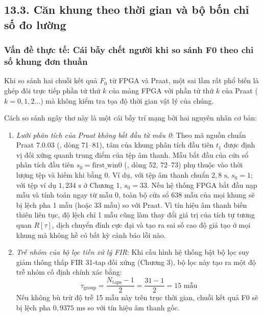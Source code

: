 \subsection*{13.3. Căn khung theo thời gian và bộ bốn chỉ số đo lường}

\subsubsection*{Vấn đề thực tế: Cái bẫy chết người khi so sánh F0 theo chỉ số khung đơn thuần}
Khi so sánh hai chuỗi kết quả $F_0$ từ FPGA và Praat, một sai lầm rất phổ biến là ghép đôi trực tiếp phần tử thứ $k$ của mảng FPGA với phần tử thứ $k$ của Praat ($k = 0, 1, 2\dots$) mà không kiểm tra tọa độ thời gian vật lý của chúng.

Cách so sánh ngây thơ này là một cái bẫy trí mạng bởi hai nguyên nhân cơ bản:
\begin{enumerate}
    \item \emph{Lưới phân tích của Praat không bắt đầu từ mẫu 0}: Theo mã nguồn chuẩn Praat 7.0.03 (, dòng 71--81), tâm của khung phân tích đầu tiên $t_1$ được định vị đối xứng quanh trung điểm của tệp âm thanh. Mẫu bắt đầu của cửa sổ phân tích đầu tiên $s_0 = \text{first\_win0}$ (, dòng 52, 72--73) phụ thuộc vào thời lượng tệp và hiếm khi bằng 0. Ví dụ, với tệp âm thanh chuẩn $2{,}8\text{ s}$, $s_0 = 1$; với tệp ví dụ $1{,}234\text{ s}$ ở Chương 1, $s_0 = 33$. Nếu hệ thống FPGA bắt đầu nạp mẫu và tính toán ngay từ mẫu $0$, toàn bộ cửa sổ 638 mẫu của mọi khung sẽ bị lệch pha 1 mẫu (hoặc 33 mẫu) so với Praat. Vì tín hiệu âm thanh biến thiên liên tục, độ lệch chỉ 1 mẫu cũng làm thay đổi giá trị của tích tự tương quan $R[\tau]$, dịch chuyển đỉnh cực đại và tạo ra sai số cao độ giả tạo ở mọi khung mà không hề có bất kỳ cảnh báo lỗi nào.
    \item \emph{Trễ nhóm của bộ lọc tiền xử lý FIR}: Khi cấu hình hệ thống bật bộ lọc suy giảm thông thấp FIR 31-tap đối xứng (Chương 3), bộ lọc này tạo ra một độ trễ nhóm cố định chính xác bằng:
    \begin{equation}
        \tau_{\text{group}} = \frac{N_{\text{taps}} - 1}{2} = \frac{31 - 1}{2} = 15\text{ mẫu}
    \end{equation}
    Nếu không bù trừ độ trễ 15 mẫu này trên trục thời gian, chuỗi kết quả F0 sẽ bị lệch pha $0{,}9375\text{ ms}$ so với tín hiệu âm thanh gốc.
\end{enumerate}


